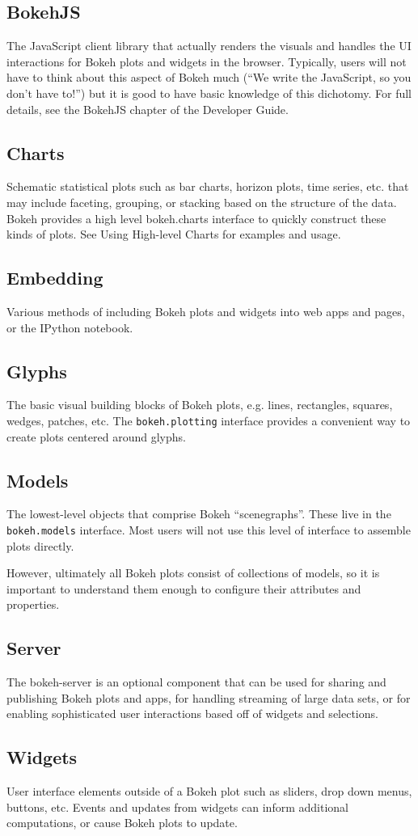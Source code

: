 \documentclass[12pt, a4paper]{report}
\begin{document}
\subsection*{BokehJS}
The JavaScript client library that actually renders the visuals and handles the UI interactions for Bokeh plots and widgets in the browser. Typically, users will not have to think about this aspect of Bokeh much (“We write the JavaScript, so you don’t have to!”) but it is good to have basic knowledge of this dichotomy. For full details, see the BokehJS chapter of the Developer Guide.
\subsection*{Charts}
Schematic statistical plots such as bar charts, horizon plots, time series, etc. that may include faceting, grouping, or stacking based on the structure of the data. Bokeh provides a high level bokeh.charts interface to quickly construct these kinds of plots. See Using High-level Charts for examples and usage.
\subsection*{Embedding}
Various methods of including Bokeh plots and widgets into web apps and pages, or the IPython notebook. 
\subsection*{Glyphs}
The basic visual building blocks of Bokeh plots, e.g. lines, rectangles, squares, wedges, patches, etc. The \texttt{bokeh.plotting} interface provides a convenient way to create plots centered around glyphs. 
\subsection*{Models}
The lowest-level objects that comprise Bokeh “scenegraphs”. These live in the \texttt{bokeh.models} interface. Most users will not use this level of interface to assemble plots directly. 

However, ultimately all Bokeh plots consist of collections of models, so it is important to understand them enough to configure their attributes and properties. 

\subsection*{Server}
The bokeh-server is an optional component that can be used for sharing and publishing Bokeh plots and apps, for handling streaming of large data sets, or for enabling sophisticated user interactions based off of widgets and selections. 

\subsection*{Widgets}
User interface elements outside of a Bokeh plot such as sliders, drop down menus, buttons, etc. Events and updates from widgets can inform additional computations, or cause Bokeh plots to update.
\end{document}
